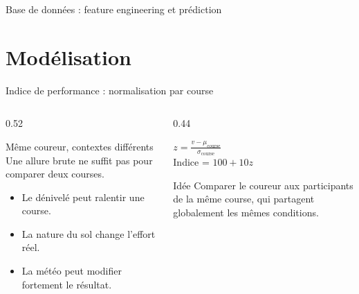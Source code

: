\documentclass[aspectratio=169,11pt]{beamer}
\begin{document}
\begin{frame}{Base de données : feature engineering et prédiction}
{}
\end{frame}

\section{Modélisation}

\begin{frame}{Indice de performance : normalisation par course}
  \begin{columns}[T,onlytextwidth]
    \begin{column}{0.52\textwidth}
      \begin{block}{Même coureur, contextes différents}
        Une allure brute ne suffit pas pour comparer deux courses.
      \end{block}
      \begin{itemize}
        \item Le dénivelé peut ralentir une course.
        \item La nature du sol change l'effort réel.
        \item La météo peut modifier fortement le résultat.
      \end{itemize}
    \end{column}
    \begin{column}{0.44\textwidth}
      \begin{center}
        {\Large\bfseries\color{condruBlue}
        $z = \frac{v - \mu_{\mathrm{course}}}{\sigma_{\mathrm{course}}}$}\\[0.5cm]
        {\large Indice = $100 + 10z$}
      \end{center}
      \begin{block}{Idée}
        Comparer le coureur aux participants de la même course, qui partagent globalement les mêmes conditions.
      \end{block}
    \end{column}
  \end{columns}
\end{frame}
\end{document}
